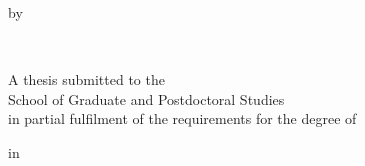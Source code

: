 \begin{titlepage}

%
%
%
%
%
%
\thispagestyle{empty}

\begin{center}


\vspace*{2\bigskipamount}

{\makeatletter
{}\LARGE\@title
\makeatother}

{\makeatletter
\ifx\@subtitle\undefined\else
    \bigskip
    \Large\@subtitle
\fi
\makeatother}



\bigskip
\bigskip
\bigskip
\bigskip
\bigskip
\bigskip

by

\bigskip
\bigskip

\makeatletter
{\bf \@firstname\ {\@lastname}}
\makeatother

\bigskip
\bigskip
\bigskip
\bigskip

A thesis submitted to the\\
School of Graduate and Postdoctoral Studies\\
in partial fulfilment of the requirements for the degree of 

\bigskip
\bigskip
\bigskip
\bigskip

{\bf{\degree}}


in


{\bf{\program}}

\bigskip
\bigskip
\bigskip
\bigskip


\end{center}
\end{titlepage}
